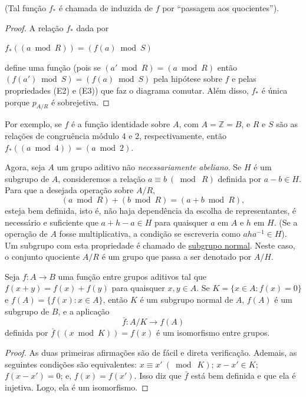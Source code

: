 (Tal função $f_*$ é chamada de induzida de $f$ por ``passagem aos quocientes'').

\begin{proof}
A relação $f_*$ dada por 
\begin{center}
  $f_*((a \bmod R)) = (f(a) \bmod S)$
\end{center}
define uma função (pois se $(a' \bmod R) = (a \bmod R)$ então $( f(a') \bmod S ) = (f(a) \bmod S)$ pela
hipótese sobre $f$ e pelas propriedades (E2) e (E3)) que faz o diagrama comutar. Além disso, $f_*$ é 
única porque $p_{A/R}$ é sobrejetiva.
\end{proof}

Por exemplo, se $f$ é a função identidade sobre $A$, com $A = \mathbb{Z} = B$, e $R$ e $S$ são as relações
de congruência módulo 4 e 2, respectivamente, então $f_*( (a \bmod 4) ) = (a \bmod 2)$.

Agora, seja $A$ um grupo aditivo não \emph{necessariamente abeliano}. Se $H$ é um subgrupo de $A$, consideremos
a relação $a \equiv b \ (\bmod \ R)$ definida por $a - b \in H$. Para que a desejada operação sobre $A/R$, 
\[
  (a \bmod R) + (b \bmod R) = (a + b \bmod R), 
\]
esteja bem definida, isto é, não haja dependência da escolha de representantes, é necessário e suficiente que 
$a + h - a \in H$ para quaisquer $a$ em $A$ e $h$ em $H$. (Se a operação de $A$ fosse multiplicativa, a condição 
se escreveria como $aha^{-1} \in H$). Um subgrupo com esta propriedade é chamado de \underline{subgrupo normal}. 
Neste caso, o conjunto quociente $A/R$ é um grupo que passa a ser denotado por $A/H$.

\begin{proposicao}
Seja $f : A \to B$ uma função entre grupos aditivos tal que $f(x+y) = f(x) + f(y)$ para quaisquer $x,y \in A$.
Se $K = \{x \in A : f(x) = 0\}$ e $f(A) = \{f(x) : x \in A\}$, então $K$ é um subgrupo normal de $A$, $f(A)$ 
é um subgrupo de $B$, e a aplicação
\[
\bar{f} : A/K \to f(A)
\]
definida por $\bar{f}((x \bmod K)) = f(x)$ é um isomorfismo entre grupos.
\end{proposicao}

\begin{proof}
As duas primeiras afirmações são de fácil e direta verificação. Ademais, as seguintes condições são equivalentes:
$x \equiv x' \ (\bmod \ K)$; $x - x' \in K$; $f(x - x') = 0$; e, $f(x) = f(x')$.
Isso diz que $\bar{f}$ está bem definida e que ela é injetiva. Logo, ela é um isomorfismo.
\end{proof}

